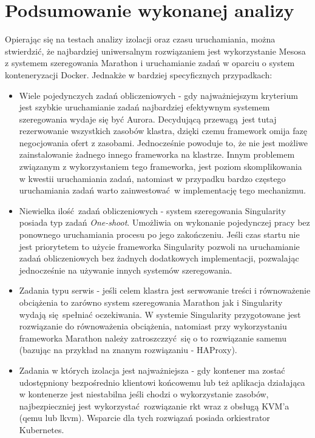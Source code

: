 \documentclass[10pt,a4paper,titlepage,twoside]{report}
\begin{document}
\onehalfspacing
\chapter{Podsumowanie wykonanej analizy}
Opierając się na testach analizy izolacji oraz czasu uruchamiania, można stwierdzić, że najbardziej uniwersalnym rozwiązaniem jest wykorzystanie Mesosa z systemem szeregowania Marathon i uruchamianie zadań w oparciu o system konteneryzacji Docker. Jednakże w bardziej specyficznych przypadkach: 
\begin{itemize}
\item Wiele pojedynczych zadań obliczeniowych - gdy najważniejszym kryterium jest szybkie uruchamianie zadań najbardziej efektywnym systemem szeregowania wydaje się być Aurora. Decydującą przewagą jest tutaj rezerwowanie wszystkich zasobów klastra, dzięki czemu framework omija fazę negocjowania ofert z zasobami. Jednocześnie powoduje to, że nie jest możliwe zainstalowanie żadnego innego frameworka na klastrze. Innym problemem związanym z wykorzystaniem tego frameworka, jest poziom skomplikowania w kwestii uruchamiania zadań, natomiast w przypadku bardzo częstego uruchamiania zadań warto zainwestować w implementację tego mechanizmu.
\item Niewielka ilość zadań obliczeniowych - system szeregowania Singularity posiada typ zadań \textit{One-shoot}. Umożliwia on wykonanie pojedynczej pracy bez ponownego uruchamiania procesu po jego zakończeniu. Jeśli czas startu nie jest priorytetem to użycie frameworka Singularity pozwoli na uruchamianie zadań obliczeniowych bez żadnych dodatkowych implementacji, pozwalając jednocześnie na używanie innych systemów szeregowania. 
\item Zadania typu serwis - jeśli celem klastra jest serwowanie treści i równoważenie obciążenia to zarówno system szeregowania Marathon jak i Singularity wydają się spełniać oczekiwania. W systemie Singularity przygotowane jest rozwiązanie do równoważenia obciążenia, natomiast przy wykorzystaniu frameworka Marathon należy zatroszczzyć się o to rozwiązanie samemu (bazując na przykład na znanym rozwiązaniu - HAProxy).
\item Zadania w których izolacja jest najważniejsza - gdy kontener ma zostać udostępniony bezpośrednio klientowi końcowemu lub też aplikacja działająca w kontenerze jest niestabilna jeśli chodzi o wykorzystanie zasobów, najbezpieczniej jest wykorzystać rozwiązanie rkt wraz z obsługą KVM'a (qemu lub lkvm). Wsparcie dla tych rozwiązań posiada orkiestrator Kubernetes.
\end{itemize}
\end{document}
